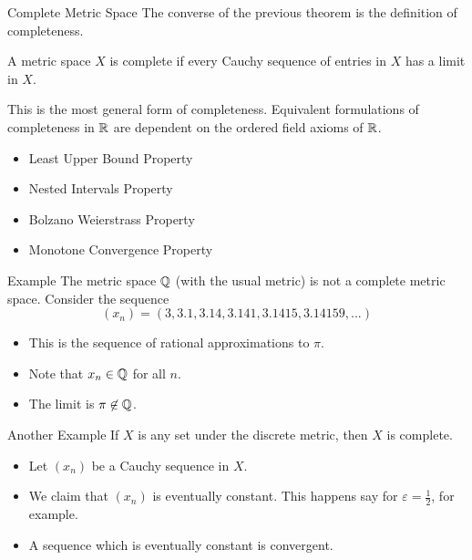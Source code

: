 \documentclass[10pt]{beamer}
\begin{document}
    \begin{frame}{Complete Metric Space}
        The converse of the previous theorem is the definition of completeness. 
        \begin{definition}
            A metric space $X$ is \alert{complete} if every Cauchy sequence of entries in $X$ has a limit in $X$. 
        \end{definition}
        This is the most general form of completeness. Equivalent formulations of completeness in $\mathbb{R}$ are dependent on the ordered field axioms of $\mathbb{R}$. 
        \begin{itemize}
            \item Least Upper Bound Property
            \item Nested Intervals Property
            \item Bolzano Weierstrass Property
            \item Monotone Convergence Property
        \end{itemize}
    \end{frame}

    \begin{frame}{Example}
        The metric space $\mathbb{Q}$ (with the usual metric) is not a complete metric space. Consider the sequence 
        \begin{equation*}
            (x_n) = (3, 3.1, 3.14, 3.141, 3.1415, 3.14159, ...)
        \end{equation*}
        \begin{itemize}
            \item<1-> This is the sequence of rational approximations to $\pi$. 
            \item<2-> Note that $x_n\in \mathbb{Q}$ for all $n$. 
            \item<3-> The limit is $\pi\not\in \mathbb{Q}$. 
        \end{itemize}
    \end{frame}

    \begin{frame}{Another Example}
        If $X$ is any set under the discrete metric, then $X$ is complete. 
        \begin{itemize}
            \item<1-> Let $(x_n)$ be a Cauchy sequence in $X$. 
            \item<2-> We claim that $(x_n)$ is eventually constant. This happens say for $\varepsilon = \frac{1}{2}$, for example. 
            \item<3-> A sequence which is eventually constant is convergent. 
        \end{itemize}
    \end{frame}
\end{document}
